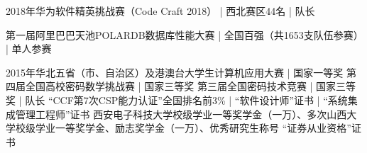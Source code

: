 \documentclass[zh]{resume}
\begin{document}
\begin{entries}

    {2018年华为软件精英挑战赛（Code Craft 2018）  \quad | \quad 西北赛区44名  \quad | \quad 队长}%

    {第一届阿里巴巴天池POLARDB数据库性能大赛  \quad | \quad 全国百强（共1653支队伍参赛）  \quad | \quad 单人参赛}%

    {2015年华北五省（市、自治区）及港澳台大学生计算机应用大赛  \quad | \quad 国家一等奖 }%
    {第四届全国高校密码数学挑战赛  \quad | \quad 国家三等奖}%
    {第三届全国密码技术竞赛  \quad | \quad 国家三等奖  \quad | \quad 队长  \quad {}}%
    {“CCF第7次CSP能力认证”全国排名前3\% | “软件设计师”证书 | “系统集成管理工程师”证书}
    {西安电子科技大学校级学业一等奖学金（一万）、多次山西大学校级学业一等奖学金、励志奖学金（一万）、优秀研究生称号}
    {“证券从业资格”证书}
\end{entries}
\end{document}
